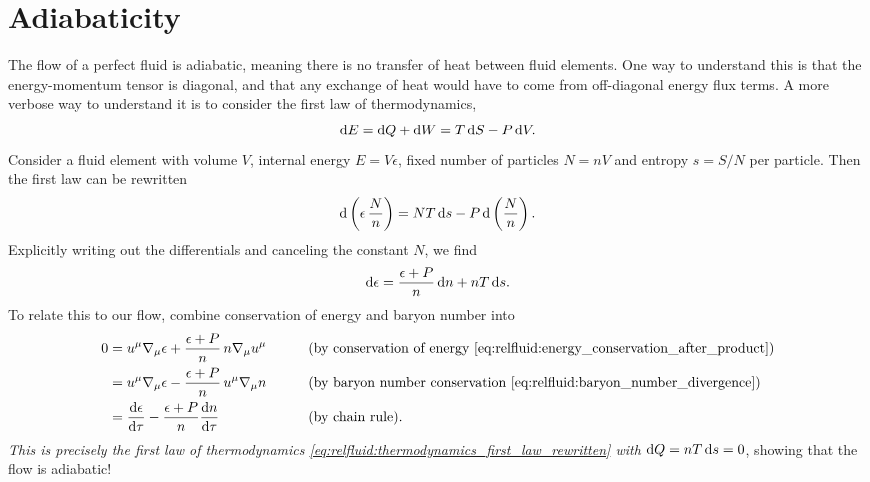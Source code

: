 \section{Adiabaticity}
\label{sec:relfluid:adiabadicity}

The flow of a perfect fluid is adiabatic, meaning there is no transfer of heat between fluid elements.
One way to understand this is that the energy-momentum tensor is diagonal, and that any exchange of heat would have to come from off-diagonal energy flux terms.
A more verbose way to understand it is to consider the first law of thermodynamics,
\begin{equation}
	\mathop{}\!\mathrm{d} E = \mathop{}\!\mathrm{d} Q + \mathop{}\!\mathrm{d} W = T \mathop{}\!\mathrm{d} S - P \mathop{}\!\mathrm{d} V .
\end{equation}
Consider a fluid element with volume $V$, internal energy $E = V \epsilon$, fixed number of particles $N = n V$ and entropy $s = S/N$ per particle.
Then the first law can be rewritten
\begin{equation}
	\mathop{}\!\mathrm{d} \left( \epsilon \, \frac{N}{n} \right) = N T \mathop{}\!\mathrm{d} s - P \mathop{}\!\mathrm{d} \left( \frac{N}{n} \right) .
\end{equation}
Explicitly writing out the differentials and canceling the constant $N$, we find
\begin{equation}
	\mathop{}\!\mathrm{d} \epsilon = \frac{\epsilon + P}{n} \mathop{}\!\mathrm{d} n + n T \mathop{}\!\mathrm{d} s .
\label{eq:relfluid:thermodynamics_first_law_rewritten}
\end{equation}
To relate this to our flow, combine conservation of energy and baryon number into
\begin{align}
	0 &= u^\mu \nabla_\mu \epsilon + \frac{\epsilon+P}{n} \, n \nabla_\mu u^\mu && \qquad \text{(by conservation of energy \eqref{eq:relfluid:energy_conservation_after_product})} \nonumber \\
	  &= u^\mu \nabla_\mu \epsilon - \frac{\epsilon+P}{n} \, u^\mu \nabla_\mu n && \qquad \text{(by baryon number conservation \eqref{eq:relfluid:baryon_number_divergence})} \nonumber \\
	  &= \odv{\epsilon}{\tau} - \frac{\epsilon+P}{n} \odv{n}{\tau}      && \qquad \text{(by chain rule)} . \label{eq:relfluid:energy_conservation_rewritten}
\end{align}
\emph{This is precisely the first law of thermodynamics \eqref{eq:relfluid:thermodynamics_first_law_rewritten} with $\mathop{}\!\mathrm{d} Q = n T \mathop{}\!\mathrm{d} s = 0$}, showing that the flow is adiabatic!

